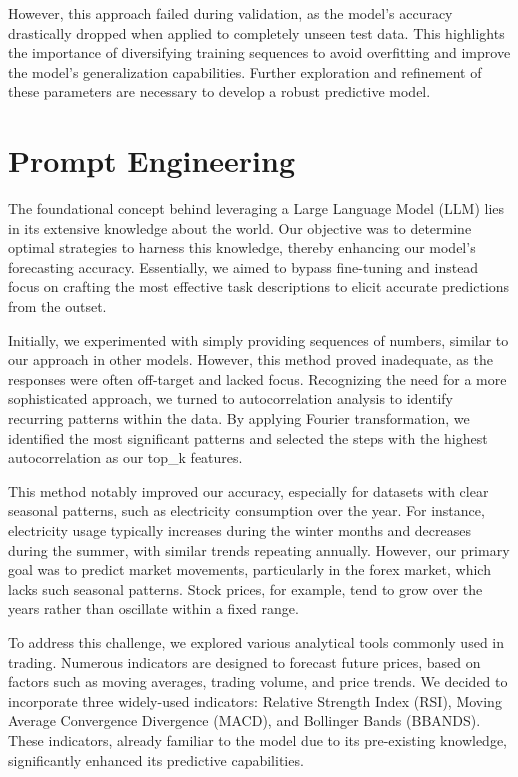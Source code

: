 However, this approach failed during validation, as the model's accuracy drastically dropped when applied to completely unseen test data. This highlights the importance of diversifying training sequences to avoid overfitting and improve the model's generalization capabilities. Further exploration and refinement of these parameters are necessary to develop a robust predictive model.

\section{Prompt Engineering}

The foundational concept behind leveraging a Large Language Model (LLM) lies in its extensive knowledge about the world. Our objective was to determine optimal strategies to harness this knowledge, thereby enhancing our model's forecasting accuracy. Essentially, we aimed to bypass fine-tuning and instead focus on crafting the most effective task descriptions to elicit accurate predictions from the outset.

Initially, we experimented with simply providing sequences of numbers, similar to our approach in other models. However, this method proved inadequate, as the responses were often off-target and lacked focus. Recognizing the need for a more sophisticated approach, we turned to autocorrelation analysis to identify recurring patterns within the data. By applying Fourier transformation, we identified the most significant patterns and selected the steps with the highest autocorrelation as our top_k features.

This method notably improved our accuracy, especially for datasets with clear seasonal patterns, such as electricity consumption over the year. For instance, electricity usage typically increases during the winter months and decreases during the summer, with similar trends repeating annually. However, our primary goal was to predict market movements, particularly in the forex market, which lacks such seasonal patterns. Stock prices, for example, tend to grow over the years rather than oscillate within a fixed range.

To address this challenge, we explored various analytical tools commonly used in trading. Numerous indicators are designed to forecast future prices, based on factors such as moving averages, trading volume, and price trends. We decided to incorporate three widely-used indicators: Relative Strength Index (RSI), Moving Average Convergence Divergence (MACD), and Bollinger Bands (BBANDS). These indicators, already familiar to the model due to its pre-existing knowledge, significantly enhanced its predictive capabilities.




